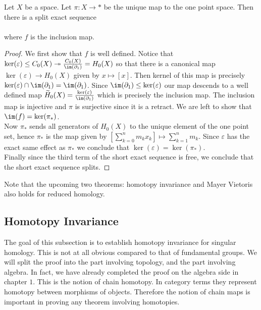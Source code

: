 \documentclass[a4paper]{article}
\begin{document}
\begin{prp}{}{} Let $X$ be a space. Let $\pi:X\to\ast$ be the unique map to the one point space. Then there is a split exact sequence \\
\\
where $f$ is the inclusion map. 
\begin{proof}
We first show that $f$ is well defined. Notice that $\ker(\varepsilon)\leq C_0(X)\twoheadrightarrow\frac{C_0(X)}{\im(\partial_1)}=H_0(X)$ so that there is a canonical map $\ker(\varepsilon)\to H_0(X)$ given by $x\mapsto[x]$. Then kernel of this map is precisely $\ker(\varepsilon)\cap\im(\partial_1)=\im(\partial_1)$. Since $\im(\partial_1)\leq\ker(\varepsilon)$ our map descends to a well defined map $\widetilde{H}_0(X)=\frac{\ker(\varepsilon)}{\im(\partial_1)}$ which is precisely the inclusion map. The inclusion map is injective and $\pi$ is surjective since it is a retract. We are left to show that $\im(f)=\ker(\pi_\ast)$. \\

Now $\pi_\ast$ sends all generators of $H_0(X)$ to the unique element of the one point set, hence $\pi_\ast$ is the map given by $\left[\sum_{k=0}^nm_k x_k\right]\mapsto\sum_{k=1}^nm_k$. Since $\varepsilon$ has the exact same effect as $\pi_\ast$ we conclude that $\ker(\varepsilon)=\ker(\pi_\ast)$. \\

Finally since the third term of the short exact sequence is free, we conclude that the short exact sequence splits. 
\end{proof}
\end{prp}

Note that the upcoming two theorems: homotopy invariance and Mayer Vietoris also holds for reduced homology. 

\subsection{Homotopy Invariance}
The goal of this subsection is to establish homotopy invariance for singular homology. This is not at all obvious compared to that of fundamental groups. We will split the proof into the part involving topology, and the part involving algebra. In fact, we have already completed the proof on the algebra side in chapter $1$. This is the notion of chain homotopy. In category terms they represent homotopy between morphisms of objects. Therefore the notion of chain maps is important in proving any theorem involving homotopies. \\
\end{document}
